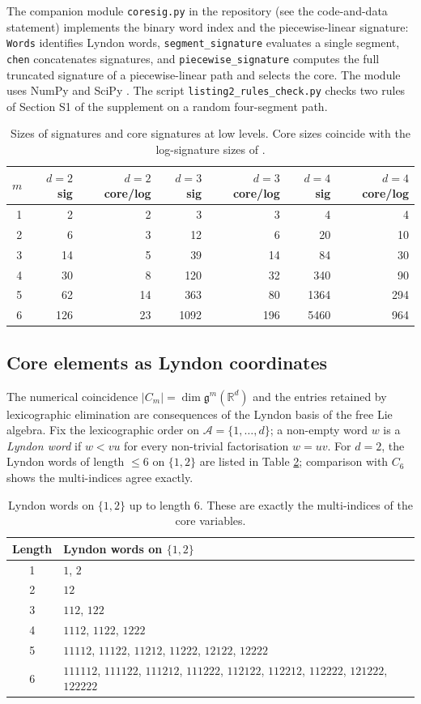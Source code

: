 \documentclass[11pt,english]{article}
\providecommand{\tabularnewline}{\\}
\theoremstyle{definition}
\theoremstyle{remark}
\begin{document}
The companion module \texttt{coresig.py} in the repository (see the
code-and-data statement) implements the binary word index and the
piecewise-linear signature: \texttt{Words} identifies Lyndon words,
\texttt{segment\_signature} evaluates a single segment,
\texttt{chen} concatenates signatures, and
\texttt{piecewise\_signature} computes the full truncated signature of
a piecewise-linear path and selects the core. The module uses NumPy
and SciPy \cite{numpy,scipy}. The script
\texttt{listing2\_rules\_check.py} checks two rules of Section S1 of
the supplement on a random four-segment path.

\begin{table}[H]
\centering
\begin{tabular}{|r|r|r|r|r|r|r|}
\hline
$m$ & $d=2$ sig & $d=2$ core/log & $d=3$ sig & $d=3$ core/log & $d=4$ sig & $d=4$ core/log\tabularnewline
\hline\hline
1 & 2 & 2 & 3 & 3 & 4 & 4\tabularnewline\hline
2 & 6 & 3 & 12 & 6 & 20 & 10\tabularnewline\hline
3 & 14 & 5 & 39 & 14 & 84 & 30\tabularnewline\hline
4 & 30 & 8 & 120 & 32 & 340 & 90\tabularnewline\hline
5 & 62 & 14 & 363 & 80 & 1364 & 294\tabularnewline\hline
6 & 126 & 23 & 1092 & 196 & 5460 & 964\tabularnewline\hline
\end{tabular}
\caption{Sizes of signatures and core signatures at low levels. Core sizes
coincide with the log-signature sizes of \cite{log signatures}.\label{tab:Sizes}}
\end{table}

\subsection{Core elements as Lyndon coordinates}

The numerical coincidence $|C_{m}|=\dim\mathfrak{g}^{m}(\mathbb{R}^{d})$
and the entries retained by lexicographic elimination
are consequences of the Lyndon basis of the free Lie algebra. Fix
the lexicographic order on $\mathcal{A}=\{1,\ldots,d\}$; a non-empty
word $w$ is a \emph{Lyndon word} if $w<vu$ for every non-trivial
factorisation $w=uv$. For $d=2$, the Lyndon words of length $\leq6$
on $\{1,2\}$ are listed in Table \ref{tab:Lyndon-d2}; comparison
with $C_{6}$ shows the multi-indices agree exactly.

\begin{table}[H]
\centering
\begin{tabular}{|c|l|}
\hline
Length & Lyndon words on $\{1,2\}$\tabularnewline
\hline\hline
1 & $1$, $2$\tabularnewline\hline
2 & $12$\tabularnewline\hline
3 & $112$, $122$\tabularnewline\hline
4 & $1112$, $1122$, $1222$\tabularnewline\hline
5 & $11112$, $11122$, $11212$, $11222$, $12122$, $12222$\tabularnewline\hline
6 & $111112$, $111122$, $111212$, $111222$, $112122$, $112212$, $112222$, $121222$, $122222$\tabularnewline\hline
\end{tabular}
\caption{Lyndon words on $\{1,2\}$ up to length 6. These are exactly the multi-indices
of the core variables.\label{tab:Lyndon-d2}}
\end{table}
\end{document}

